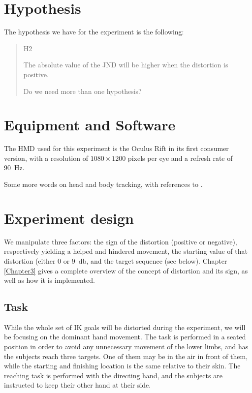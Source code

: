 \section{Hypothesis}

The hypothesis we have for the experiment is the following:

\begin{quote}
    \begin{labeling}[:]{H2}
      \item [H1] The absolute value of the JND will be higher when the distortion is positive.
      \item [H2] Do we need more than one hypothesis?
    \end{labeling}
\end{quote}

\section{Equipment and Software}

The HMD used for this experiment is the Oculus Rift in its first consumer version, with a resolution of $1080 \times 1200$ pixels per eye and a refresh rate of \SI{90}{\hertz}.

Some more words on head and body tracking, with references to \cite{molla2013singularity}.

\section{Experiment design}

We manipulate three factors: the sign of the distortion (positive or negative), respectively yielding a helped and hindered movement, the starting value of that distortion (either \num{0} or \SI{9}{\decibel}, and the target sequence (see below). Chapter \ref{Chapter3} gives a complete overview of the concept of distortion and its sign, as well as how it is implemented.

\subsection{Task}

While the whole set of IK goals will be distorted during the experiment, we will be focusing on the dominant hand movement. The task is performed in a seated position in order to avoid any unnecessary movement of the lower limbs, and has the subjects reach three targets. One of them may be in the air in front of them, while the starting and finishing location is the same relative to their skin. The reaching task is performed with the directing hand, and the subjects are instructed to keep their other hand at their side.

